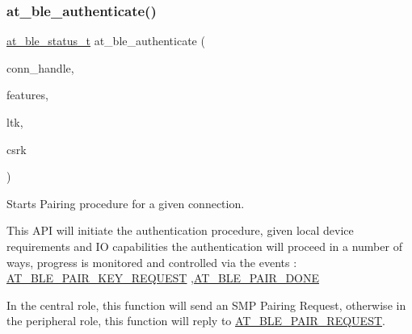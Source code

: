 \subsubsection{\texorpdfstring{at\_ble\_authenticate()}{at\_ble\_authenticate()}}
{\footnotesize\ttfamily \mbox{\hyperlink{group__error__codes__group_ga3b1db9b95feb157b3c188ca27fe76988}{at\+\_\+ble\+\_\+status\+\_\+t}} at\+\_\+ble\+\_\+authenticate (\begin{DoxyParamCaption}\item[{\mbox{\hyperlink{at__ble__api_8h_abd23646d0c662860741f787efc8456f2}{at\+\_\+ble\+\_\+handle\+\_\+t}}}]{conn\+\_\+handle,  }\item[{\mbox{\hyperlink{structat__ble__pair__features__t}{at\+\_\+ble\+\_\+pair\+\_\+features\+\_\+t}} $\ast$}]{features,  }\item[{\mbox{\hyperlink{structat__ble___l_t_k__t}{at\+\_\+ble\+\_\+\+L\+T\+K\+\_\+t}} $\ast$}]{ltk,  }\item[{\mbox{\hyperlink{structat__ble___c_s_r_k__t}{at\+\_\+ble\+\_\+\+C\+S\+R\+K\+\_\+t}} $\ast$}]{csrk }\end{DoxyParamCaption})}



Starts Pairing procedure for a given connection. 

This A\+PI will initiate the authentication procedure, given local device requirements and IO capabilities the authentication will proceed in a number of ways, progress is monitored and controlled via the events \+: \mbox{\hyperlink{at__ble__api_8h_a3324640b95f33169515f89738ed5baeba80a994d218165f5cf29199df84a37344}{A\+T\+\_\+\+B\+L\+E\+\_\+\+P\+A\+I\+R\+\_\+\+K\+E\+Y\+\_\+\+R\+E\+Q\+U\+E\+ST}} ,\mbox{\hyperlink{at__ble__api_8h_a3324640b95f33169515f89738ed5baeba7cd0dfd439d72bcb3ba51e77fdd993e7}{A\+T\+\_\+\+B\+L\+E\+\_\+\+P\+A\+I\+R\+\_\+\+D\+O\+NE}}

In the central role, this function will send an S\+MP Pairing Request, otherwise in the peripheral role, this function will reply to \mbox{\hyperlink{at__ble__api_8h_a3324640b95f33169515f89738ed5baeba775c3ad5c922c767189c8366205adecd}{A\+T\+\_\+\+B\+L\+E\+\_\+\+P\+A\+I\+R\+\_\+\+R\+E\+Q\+U\+E\+ST}}.

